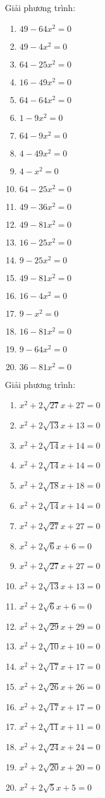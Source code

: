 \documentclass[12pt,a4paper]{article}
\begin{document}
\begin{ex}
	Giải phương trình:
	\begin{enumerate}
		\item ${49 - 64x^2}=0$
		\item ${49 - 4x^2}=0$
		\item ${64 - 25x^2}=0$
		\item ${16 - 49x^2}=0$
		\item ${64 - 64x^2}=0$
		\item ${1 - 9x^2}=0$
		\item ${64 - 9x^2}=0$
		\item ${4 - 49x^2}=0$
		\item ${4 - x^2}=0$
		\item ${64 - 25x^2}=0$
		\item ${49 - 36x^2}=0$
		\item ${49 - 81x^2}=0$
		\item ${16 - 25x^2}=0$
		\item ${9 - 25x^2}=0$
		\item ${49 - 81x^2}=0$
		\item ${16 - 4x^2}=0$
		\item ${9 - x^2}=0$
		\item ${16 - 81x^2}=0$
		\item ${9 - 64x^2}=0$
		\item ${36 - 81x^2}=0$
	\end{enumerate}
\end{ex}

\begin{ex}
	Giải phương trình:
	\begin{enumerate}
		\item ${x^2 + 2\sqrt{27}x+27}=0$
		\item ${x^2 + 2\sqrt{13}x+13}=0$
		\item ${x^2 + 2\sqrt{14}x+14}=0$
		\item ${x^2 + 2\sqrt{14}x+14}=0$
		\item ${x^2 + 2\sqrt{18}x+18}=0$
		\item ${x^2 + 2\sqrt{14}x+14}=0$
		\item ${x^2 + 2\sqrt{27}x+27}=0$
		\item ${x^2 + 2\sqrt{6}x+6}=0$
		\item ${x^2 + 2\sqrt{27}x+27}=0$
		\item ${x^2 + 2\sqrt{13}x+13}=0$
		\item ${x^2 + 2\sqrt{6}x+6}=0$
		\item ${x^2 + 2\sqrt{29}x+29}=0$
		\item ${x^2 + 2\sqrt{10}x+10}=0$
		\item ${x^2 + 2\sqrt{17}x+17}=0$
		\item ${x^2 + 2\sqrt{26}x+26}=0$
		\item ${x^2 + 2\sqrt{17}x+17}=0$
		\item ${x^2 + 2\sqrt{11}x+11}=0$
		\item ${x^2 + 2\sqrt{24}x+24}=0$
		\item ${x^2 + 2\sqrt{20}x+20}=0$
		\item ${x^2 + 2\sqrt{5}x+5}=0$
	\end{enumerate}
\end{ex}
\end{document}
